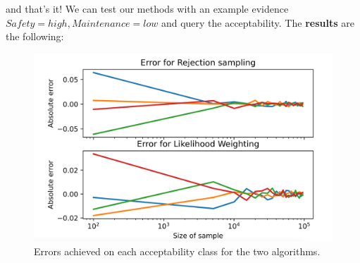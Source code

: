 and that's it! We can test our methods with an example evidence $Safety=high,Maintenance=low$ and query the acceptability. The \textbf{results} are the following:
\begin{figure}[ht]
    \centering\includegraphics[width=0.8\linewidth]{figures/errors.png}
    \caption{Errors achieved on each acceptability class for the two algorithms.}
    \label{fig:errors}
\end{figure}
